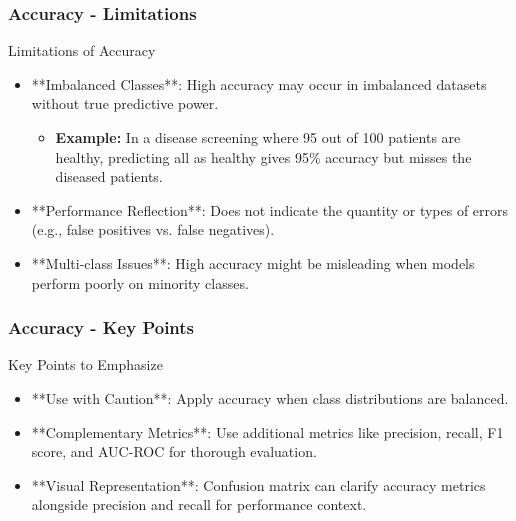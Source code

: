 \documentclass[aspectratio=169]{beamer}
\begin{document}
\begin{frame}[fragile]
    \frametitle{Accuracy - Limitations}
    \begin{block}{Limitations of Accuracy}
        \begin{itemize}
            \item **Imbalanced Classes**: High accuracy may occur in imbalanced datasets without true predictive power.
            \begin{itemize}
                \item \textbf{Example:} In a disease screening where 95 out of 100 patients are healthy, predicting all as healthy gives 95\% accuracy but misses the diseased patients.
            \end{itemize}
            \item **Performance Reflection**: Does not indicate the quantity or types of errors (e.g., false positives vs. false negatives).
            \item **Multi-class Issues**: High accuracy might be misleading when models perform poorly on minority classes.
        \end{itemize}
    \end{block}
\end{frame}

\begin{frame}[fragile]
    \frametitle{Accuracy - Key Points}
    \begin{block}{Key Points to Emphasize}
        \begin{itemize}
            \item **Use with Caution**: Apply accuracy when class distributions are balanced.
            \item **Complementary Metrics**: Use additional metrics like precision, recall, F1 score, and AUC-ROC for thorough evaluation.
            \item **Visual Representation**: Confusion matrix can clarify accuracy metrics alongside precision and recall for performance context.
        \end{itemize}
    \end{block}
\end{frame}
\end{document}
